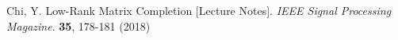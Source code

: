 \documentclass[12pt,a4paper]{report}
\begin{document}

\begin{thebibliography}{9}

  Chi, Y. Low-Rank Matrix Completion [Lecture Notes].
  {\em IEEE Signal Processing Magazine}. \textbf{35}, 178-181 (2018)

\end{thebibliography}
\cleardoublepage{} %
\end{document}
